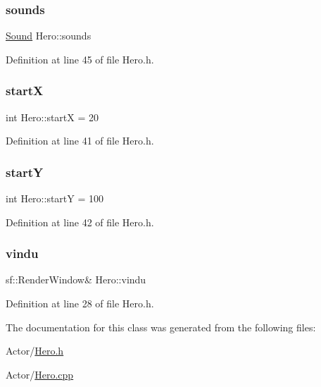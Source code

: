 \subsubsection{\texorpdfstring{sounds}{sounds}}
{\footnotesize\ttfamily \hyperlink{class_sound}{Sound} Hero\+::sounds}



Definition at line 45 of file Hero.\+h.

\hypertarget{class_hero_a546472f45445c2ad4db03ec6555d32fd}{}\label{class_hero_a546472f45445c2ad4db03ec6555d32fd} 
\subsubsection{\texorpdfstring{startX}{startX}}
{\footnotesize\ttfamily int Hero\+::startX = 20}



Definition at line 41 of file Hero.\+h.

\hypertarget{class_hero_a517e87f337a24614d52bab4dcf0287e9}{}\label{class_hero_a517e87f337a24614d52bab4dcf0287e9} 
\subsubsection{\texorpdfstring{startY}{startY}}
{\footnotesize\ttfamily int Hero\+::startY = 100}



Definition at line 42 of file Hero.\+h.

\hypertarget{class_hero_af5ac5a52b7b852cafbe92d6ba4511e37}{}\label{class_hero_af5ac5a52b7b852cafbe92d6ba4511e37} 
\subsubsection{\texorpdfstring{vindu}{vindu}}
{\footnotesize\ttfamily sf\+::\+Render\+Window\& Hero\+::vindu}



Definition at line 28 of file Hero.\+h.



The documentation for this class was generated from the following files\+:\begin{DoxyCompactItemize}
\item 
Actor/\hyperlink{_hero_8h}{Hero.\+h}\item 
Actor/\hyperlink{_hero_8cpp}{Hero.\+cpp}\end{DoxyCompactItemize}
